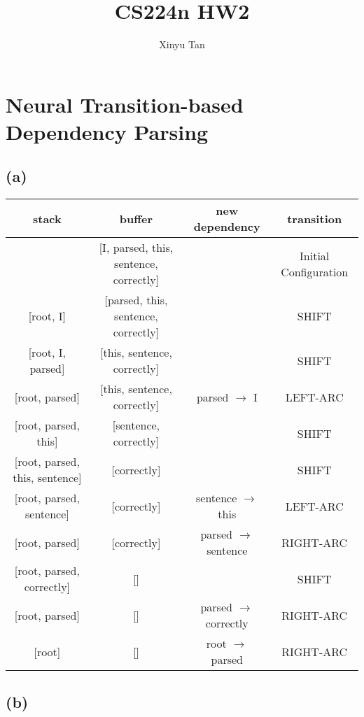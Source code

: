 \documentclass[12pt]{article}
\newcommand*{\myfont}{\fontfamily{<qcr>}\selectfont}
\begin{document}
\title{CS224n HW2}
\author{Xinyu Tan}
\maketitle

\section {Neural Transition-based Dependency Parsing}
\subsection*{(a)}

\begin{center}
\begin{tabular}{c|c|c|c}
stack & buffer & new dependency & transition\\
\hline
[root] & [I, parsed, this, sentence, correctly] &  & Initial Configuration \\
{[root, I]} & [parsed, this, sentence, correctly] &  & {\myfont SHIFT } \\
{[root, I, parsed]} & [this, sentence, correctly] &  & {\myfont SHIFT} \\ 
{[root, parsed]} & [this, sentence, correctly] & parsed $\rightarrow$ I & {\myfont LEFT-ARC} \\ 
{[root, parsed, this]} & [sentence, correctly] &  & {\myfont SHIFT} \\
{[root, parsed, this, sentence]} & [correctly] &  & {\myfont SHIFT} \\
{[root, parsed, sentence]} & [correctly] & sentence $\rightarrow$ this & {\myfont LEFT-ARC} \\
{[root, parsed]} & [correctly] & parsed $\rightarrow$ sentence  & {\myfont RIGHT-ARC} \\
{[root, parsed, correctly]} & [] &  & {\myfont SHIFT} \\
{[root, parsed]} & [] & parsed $\rightarrow$ correctly  & {\myfont RIGHT-ARC} \\
{[root]} & [] & root $\rightarrow$ parsed  & {\myfont RIGHT-ARC} \\
\end{tabular}
\end{center}

\subsection*{(b)}
\end{document}

